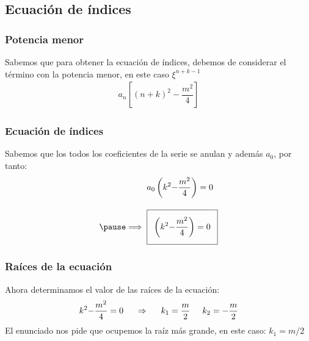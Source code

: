 \subsection{Ecuación de índices}
\begin{frame}
\frametitle{Potencia menor}
Sabemos que para obtener la ecuación de índices, debemos de considerar el término con la potencia menor, en este caso $\xi^{n+k-1}$
\pause
\begin{align*}
a_{n} \left[ (n {+} k)^{2} {-} \dfrac{m^{2}}{4} \right] 
\end{align*}
\end{frame}
\begin{frame}
\frametitle{Ecuación de índices}
Sabemos que los todos los coeficientes de la serie se anulan y además $a_{0}$, por tanto:
\begin{eqnarray*}
&a_{0} \left( k^{2} {-} \dfrac{m^{2}}{4} \right) = 0 \\[1em] \pause
\Longrightarrow \hspace{0.2cm} & \addtolength{\fboxsep}{5pt}\boxed{ \left( k^{2} {-} \dfrac{m^{2}}{4} \right) = 0}
\end{eqnarray*}
\end{frame}
\begin{frame}
\frametitle{Raíces de la ecuación}
Ahora determinamos el valor de las raíces de la ecuación:
\begin{align*}
k^{2} {-} \dfrac{m^{2}}{4} = 0 \hspace{0.5cm} \Rightarrow \hspace{0.5cm} k_{1} = \dfrac{m}{2} \hspace{0.5cm} k_{2} = -\dfrac{m}{2}
\end{align*}
\pause
El enunciado nos pide que ocupemos la raíz más grande, en este caso: $k_{1} = m/2$
\end{frame}
